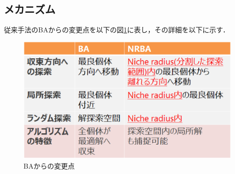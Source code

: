 \documentclass[a4j,11pt]{jarticle}
\begin{document}
\subsection{メカニズム}
\label{ss:NRBA-abst}
従来手法のBAからの変更点を以下の図\ref{fig:nr_tab}に表し，その詳細を以下に示す．
\begin{figure}[h]
  \centering
  \includegraphics[width=0.7\linewidth]{eps/nr_table.eps}
  \caption{BAからの変更点}
  \label{fig:nr_tab}
\end{figure}
\end{document}
